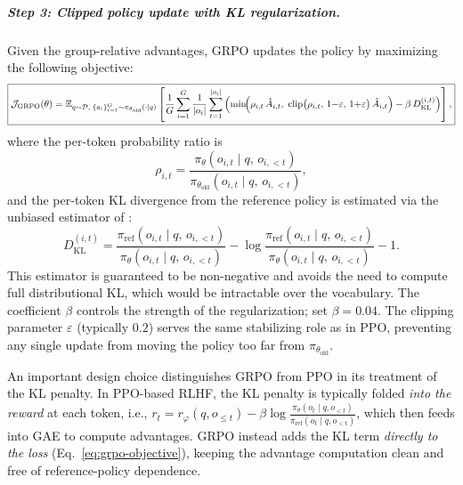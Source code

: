 \subparagraph{Step 3: Clipped policy update with KL regularization.}
Given the group-relative advantages, GRPO updates the policy by
maximizing the following objective:
\begin{equation}
\label{eq:grpo-objective}
\boxed{
\mathcal{J}_{\text{GRPO}}(\theta)
  = \mathbb{E}_{q \sim \mathcal{D},\;
      \{o_i\}_{i=1}^{G} \sim \pi_{\theta_{\text{old}}}(\cdot|q)}
    \left[
      \frac{1}{G}\sum_{i=1}^{G}
      \frac{1}{|o_i|}\sum_{t=1}^{|o_i|}
      \left(
        \min\!\Bigl(
          \rho_{i,t}\,\hat{A}_{i,t},\;
          \operatorname{clip}\bigl(\rho_{i,t},\,
            1{-}\varepsilon,\,1{+}\varepsilon\bigr)\,\hat{A}_{i,t}
        \Bigr)
        - \beta\, D_{\mathrm{KL}}^{(i,t)}
      \right)
    \right],}
\end{equation}
where the per-token probability ratio is
\begin{equation}
\label{eq:grpo-ratio}
\rho_{i,t}
  = \frac{\pi_\theta(o_{i,t} \mid q,\, o_{i,<t})}
         {\pi_{\theta_{\text{old}}}(o_{i,t} \mid q,\, o_{i,<t})},
\end{equation}
and the per-token KL divergence from the reference policy is estimated via
the unbiased estimator of \cite{schulman2017ppo}:
\begin{equation}
\label{eq:grpo-kl}
D_{\mathrm{KL}}^{(i,t)}
  = \frac{\pi_{\text{ref}}(o_{i,t} \mid q,\, o_{i,<t})}
         {\pi_\theta(o_{i,t} \mid q,\, o_{i,<t})}
  - \log\frac{\pi_{\text{ref}}(o_{i,t} \mid q,\, o_{i,<t})}
             {\pi_\theta(o_{i,t} \mid q,\, o_{i,<t})}
  - 1.
\end{equation}
This estimator is guaranteed to be non-negative and avoids the need to
compute full distributional KL, which would be intractable over the
vocabulary.  The coefficient $\beta$ controls the strength of the
regularization; \cite{shao2024deepseekmath} set $\beta = 0.04$.  The
clipping parameter $\varepsilon$ (typically $0.2$) serves the same
stabilizing role as in PPO, preventing any single update from moving the
policy too far from $\pi_{\theta_{\text{old}}}$.

An important design choice distinguishes GRPO from PPO in its treatment of
the KL penalty.  In PPO-based RLHF, the KL penalty is typically folded
\emph{into the reward} at each token, i.e.,
$r_t = r_\varphi(q, o_{\leq t}) - \beta \log
\frac{\pi_\theta(o_t \mid q, o_{<t})}{\pi_{\text{ref}}(o_t \mid q, o_{<t})}$,
which then feeds into GAE to compute advantages.  GRPO instead adds the KL
term \emph{directly to the loss} (Eq.~\ref{eq:grpo-objective}), keeping the
advantage computation clean and free of reference-policy dependence.

